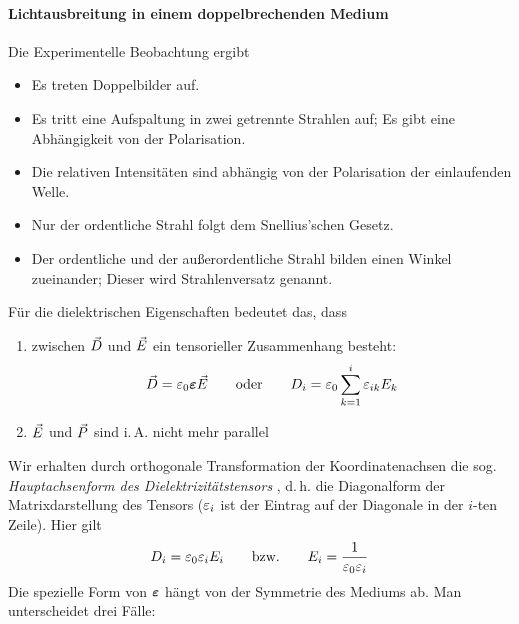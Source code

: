\paragraph{Lichtausbreitung in einem doppelbrechenden Medium}
Die Experimentelle Beobachtung ergibt
\begin{itemize}
\item Es treten Doppelbilder auf.
\item Es tritt eine Aufspaltung in zwei getrennte Strahlen auf; Es
  gibt eine Abhängigkeit von der Polarisation.
\item Die relativen Intensitäten sind abhängig von der Polarisation
  der einlaufenden Welle.
\item Nur der ordentliche Strahl folgt dem Snellius'schen Gesetz.
\item Der ordentliche und der außerordentliche Strahl bilden einen
  Winkel zueinander; Dieser wird
  Strahlenversatz genannt.
\end{itemize}
Für die dielektrischen Eigenschaften bedeutet das, dass
\begin{enumerate}
\item zwischen $\vec{D}$ und $\vec{E}$ ein tensorieller Zusammenhang
  besteht:
  \begin{gather*}
    \vec{D}=\varepsilon_0\boldsymbol{\varepsilon}\vec{E}
    \qquad\text{oder}\qquad
    D_i = \varepsilon_0\sum_{k=1}^i \varepsilon_{ik}E_k
  \end{gather*}%
\item $\vec{E}$ und $\vec{P}$ sind i.\,A. nicht mehr parallel
\end{enumerate}
Wir erhalten durch orthogonale Transformation der Koordinatenachsen die
sog. \emph{Hauptachsenform des Dielektrizitätstensors}%
,
d.\,h. die Diagonalform der Matrixdarstellung des Tensors 
($\varepsilon_i$%
ist der Eintrag auf der Diagonale in der $i$-ten Zeile). Hier gilt
\begin{gather*}
  D_i = \varepsilon_0\varepsilon_iE_i
  \qquad\text{bzw.}\qquad
  E_i = \frac{1}{\varepsilon_0\varepsilon_i}
\end{gather*}%
Die spezielle Form von $\boldsymbol{\varepsilon}$ hängt von der Symmetrie des Mediums ab.
Man unterscheidet drei Fälle:
